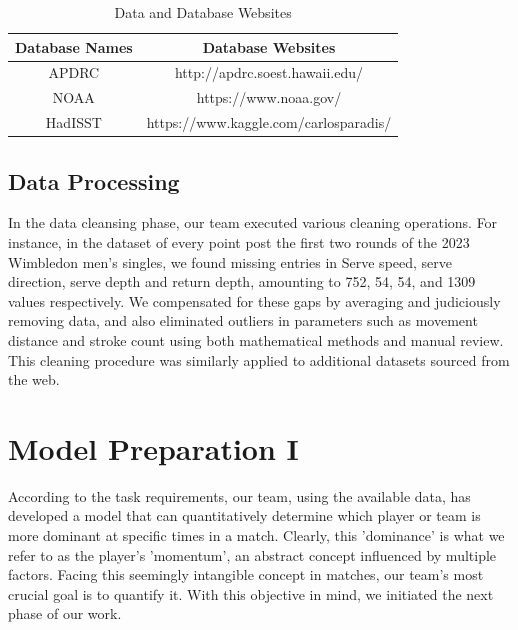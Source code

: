 \documentclass[12pt]{article}  %
\begin{document}
\begin{table}[htbp]
\begin{center}
\caption{Data and Database Websites}
\resizebox{\textwidth}{!}
{\begin{tabular}{c c}
\toprule[2pt]
\multicolumn{1}{m{5cm}}{\centering \textbf{Database Names}}
&\multicolumn{1}{m{10cm}}{\centering \textbf{Database Websites} }\\ %
\midrule
APDRC & http://apdrc.soest.hawaii.edu/ \\
NOAA & https://www.noaa.gov/ \\
HadISST & https://www.kaggle.com/carlosparadis/ \\ 
\bottomrule[2pt]
\end{tabular}}
\end{center}
\end{table}

\subsection{Data Processing}
In the data cleansing phase, our team executed various cleaning operations. For instance, 
in the dataset of every point post the first two rounds of the 2023 Wimbledon men's singles, 
we found missing entries in Serve speed, serve direction, serve depth and return depth, 
amounting to 752, 54, 54, and 1309 values respectively. We compensated for these gaps by averaging and judiciously removing data, 
and also eliminated outliers in parameters such as movement distance and stroke count using both mathematical methods and manual review. 
This cleaning procedure was similarly applied to additional datasets sourced from the web.

\section{Model Preparation I}
According to the task requirements, our team, using the available data, 
has developed a model that can quantitatively determine which player or team is more dominant at specific times in a match. 
Clearly, this 'dominance' is what we refer to as the player's 'momentum', an abstract concept influenced by multiple factors. 
Facing this seemingly intangible concept in matches, 
our team's most crucial goal is to quantify it. With this objective in mind, we initiated the next phase of our work.
\end{document}
